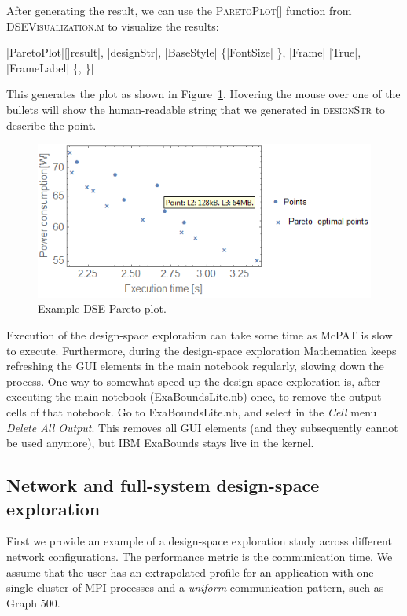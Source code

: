 After generating the result, we can use the \textsc{ParetoPlot[]} function from \textsc{DSEVisualization.m} to visualize the results:
\begin{mma}
\In |ParetoPlot|[|result|, |designStr|, \linebreak |BaseStyle| \rightarrow \{|FontSize| \}, \linebreak |Frame| \rightarrow |True|, \linebreak |FrameLabel| \rightarrow \{,  \}] \\
\end{mma}
This generates the plot as shown in Figure~\ref{fig:300:dseresult}. Hovering the mouse over one of the bullets will show the human-readable string that we generated in \textsc{designStr} to describe the point.

\begin{figure}
 \centering
 \includegraphics[width=0.8\columnwidth]{img/DSEexample.png}
 \caption{Example DSE Pareto plot.}
 \label{fig:300:dseresult}
\end{figure}

Execution of the design-space exploration can take some time as McPAT is slow to execute. Furthermore, during the design-space exploration Mathematica keeps refreshing the GUI elements in the main notebook regularly, slowing down the process. One way to somewhat speed up the design-space exploration is, after executing the main notebook (ExaBoundsLite.nb) once, to remove the output cells of that notebook. Go to ExaBoundsLite.nb, and select in the \emph{Cell} menu \emph{Delete All Output}. This removes all GUI elements (and they subsequently cannot be used anymore), but IBM ExaBounds stays live in the kernel.

\subsection{Network and full-system design-space exploration}
First we provide an example of a design-space exploration study across different network configurations. The performance metric is the communication time. We assume that the user has an extrapolated profile for an application with one single cluster of MPI processes and a \textit{uniform} communication pattern, such as Graph 500.

